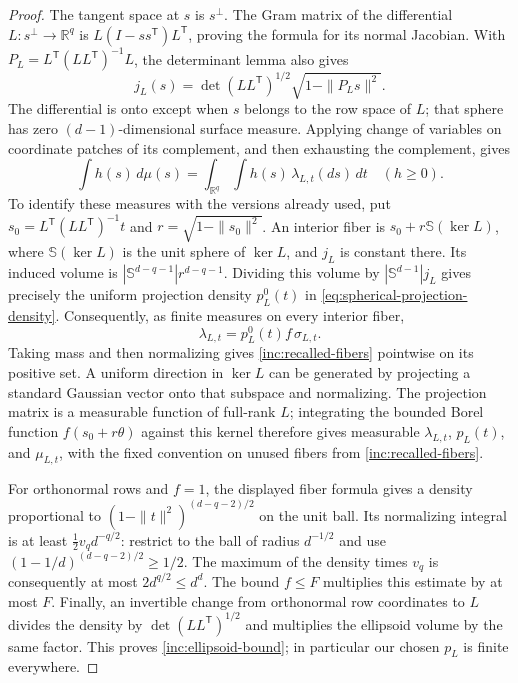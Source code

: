\begin{proof}
The tangent space at \(s\) is \(s^\perp\).  The Gram matrix of the
differential \(L:s^\perp\to\mathbb R^q\) is
\(L(I-ss^{\mathsf T})L^{\mathsf T}\), proving the formula for its normal
Jacobian.  With
\(P_L=L^{\mathsf T}(LL^{\mathsf T})^{-1}L\), the determinant lemma also gives
\[
 j_L(s)=\det(LL^{\mathsf T})^{1/2}\sqrt{1-\|P_Ls\|^2}.
\]
The differential is onto except when \(s\) belongs to the row space of
\(L\); that sphere has zero \((d-1)\)-dimensional surface measure.
Applying change of variables on coordinate patches of its complement,
and then exhausting the complement, gives
\[
 \int h(s)\,d\mu(s)
 =\int_{\mathbb R^q}\int h(s)\,\lambda_{L,t}(ds)\,dt
 \quad(h\ge0).
\]
To identify these measures with the versions already used, put
\(s_0=L^{\mathsf T}(LL^{\mathsf T})^{-1}t\) and
\(r=\sqrt{1-\|s_0\|^2}\).  An interior fiber is
\(s_0+r\mathbb S(\ker L)\), where \(\mathbb S(\ker L)\) is the unit
sphere of \(\ker L\), and \(j_L\) is constant there.  Its induced
volume is \(|\mathbb S^{d-q-1}|r^{d-q-1}\).  Dividing this volume by
\(|\mathbb S^{d-1}|j_L\) gives precisely the uniform projection density
\(p_L^0(t)\) in \eqref{eq:spherical-projection-density}.  Consequently,
as finite measures on every interior fiber,
\[
 \lambda_{L,t}=p_L^0(t)f\,\sigma_{L,t}.
\]
Taking mass and then normalizing gives \eqref{inc:recalled-fibers}
pointwise on its positive set.  A uniform
direction in \(\ker L\) can be generated by projecting a standard
Gaussian vector onto that subspace and normalizing.  The projection
matrix is a measurable function of full-rank \(L\); integrating the
bounded Borel function \(f(s_0+r\theta)\) against this kernel therefore
gives measurable \(\lambda_{L,t}\), \(p_L(t)\), and \(\mu_{L,t}\),
with the fixed convention on unused fibers from \eqref{inc:recalled-fibers}.

For orthonormal rows and \(f=1\), the displayed fiber formula gives a
density proportional to
\((1-\|t\|^2)^{(d-q-2)/2}\) on the unit ball.  Its normalizing integral
is at least \(\tfrac12v_qd^{-q/2}\): restrict to the ball of radius
\(d^{-1/2}\) and use
\((1-1/d)^{(d-q-2)/2}\ge1/2\).
The maximum of the density times \(v_q\) is consequently at most
\(2d^{q/2}\le d^d\).  The bound \(f\le F\) multiplies this estimate by
at most \(F\).  Finally, an invertible change from orthonormal
row coordinates to \(L\) divides the density by
\(\det(LL^{\mathsf T})^{1/2}\) and multiplies the ellipsoid volume by
the same factor.  This proves \eqref{inc:ellipsoid-bound}; in particular
our chosen \(p_L\) is finite everywhere.
\end{proof}


